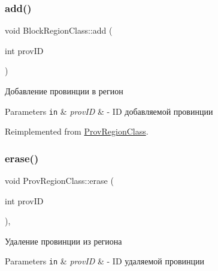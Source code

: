 \subsubsection{\texorpdfstring{add()}{add()}}
{\footnotesize\ttfamily void Block\+Region\+Class\+::add (\begin{DoxyParamCaption}\item[{int}]{prov\+ID }\end{DoxyParamCaption})\hspace{0.3cm}{\ttfamily [virtual]}}



Добавление провинции в регион 


\begin{DoxyParams}[1]{Parameters}
\mbox{\tt in}  & {\em prov\+ID} & -\/ ID добавляемой провинции \\
\hline
\end{DoxyParams}


Reimplemented from \hyperlink{class_prov_region_class_a47f41cef997877d288ea420dca7b9e81}{Prov\+Region\+Class}.

\mbox{\label{class_prov_region_class_ad28dbe98716517339922d6c4e0433611}} 
\subsubsection{\texorpdfstring{erase()}{erase()}}
{\footnotesize\ttfamily void Prov\+Region\+Class\+::erase (\begin{DoxyParamCaption}\item[{int}]{prov\+ID }\end{DoxyParamCaption})\hspace{0.3cm}{\ttfamily [virtual]}, {\ttfamily [inherited]}}



Удаление провинции из региона 


\begin{DoxyParams}[1]{Parameters}
\mbox{\tt in}  & {\em prov\+ID} & -\/ ID удаляемой провинции \\
\hline
\end{DoxyParams}
\mbox{\label{class_prov_region_class_ab6f83c85a913b7f9ac3f6839b3386793}} 
